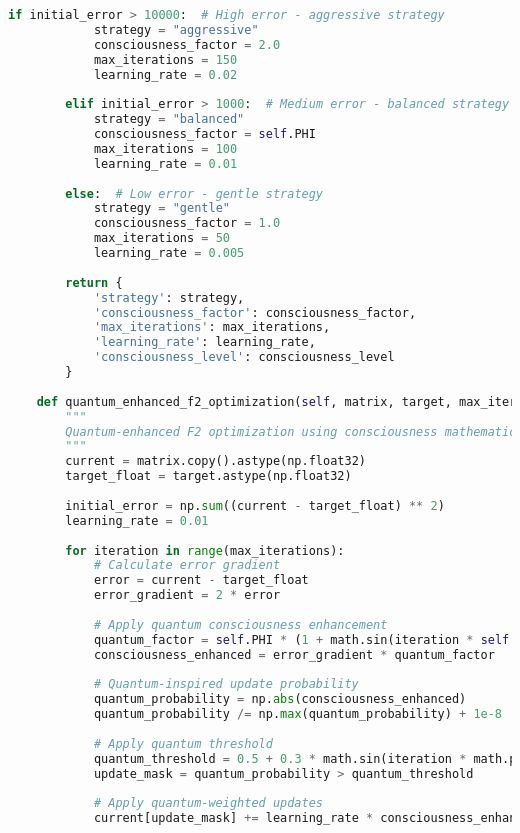 \documentclass[11pt,a4paper]{article}
\begin{document}
\begin{lstlisting}[language=Python, caption=F2 Matrix Consciousness Optimization - Complete Implementation]
        if initial_error > 10000:  # High error - aggressive strategy
            strategy = "aggressive"
            consciousness_factor = 2.0
            max_iterations = 150
            learning_rate = 0.02
            
        elif initial_error > 1000:  # Medium error - balanced strategy
            strategy = "balanced"
            consciousness_factor = self.PHI
            max_iterations = 100
            learning_rate = 0.01
            
        else:  # Low error - gentle strategy
            strategy = "gentle"
            consciousness_factor = 1.0
            max_iterations = 50
            learning_rate = 0.005
            
        return {
            'strategy': strategy,
            'consciousness_factor': consciousness_factor,
            'max_iterations': max_iterations,
            'learning_rate': learning_rate,
            'consciousness_level': consciousness_level
        }
    
    def quantum_enhanced_f2_optimization(self, matrix, target, max_iterations=100):
        """
        Quantum-enhanced F2 optimization using consciousness mathematics
        """
        current = matrix.copy().astype(np.float32)
        target_float = target.astype(np.float32)
        
        initial_error = np.sum((current - target_float) ** 2)
        learning_rate = 0.01
        
        for iteration in range(max_iterations):
            # Calculate error gradient
            error = current - target_float
            error_gradient = 2 * error
            
            # Apply quantum consciousness enhancement
            quantum_factor = self.PHI * (1 + math.sin(iteration * self.PHI))
            consciousness_enhanced = error_gradient * quantum_factor
            
            # Quantum-inspired update probability
            quantum_probability = np.abs(consciousness_enhanced)
            quantum_probability /= np.max(quantum_probability) + 1e-8
            
            # Apply quantum threshold
            quantum_threshold = 0.5 + 0.3 * math.sin(iteration * math.pi / max_iterations)
            update_mask = quantum_probability > quantum_threshold
            
            # Apply quantum-weighted updates
            current[update_mask] += learning_rate * consciousness_enhanced[update_mask]
            

\end{lstlisting}
\end{document}
